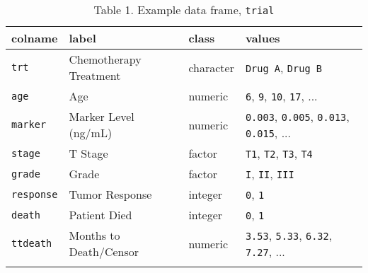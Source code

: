 \captionsetup[table]{labelformat=empty,skip=1pt}
\begin{longtable}{llll}
\toprule
colname & label & class & values \\ 
\midrule
\texttt{trt} & Chemotherapy Treatment & character & \texttt{Drug A}, \texttt{Drug B} \\ 
\texttt{age} & Age & numeric & \texttt{6}, \texttt{9}, \texttt{10}, \texttt{17}, ... \\ 
\texttt{marker} & Marker Level (ng/mL) & numeric & \texttt{0.003}, \texttt{0.005}, \texttt{0.013}, \texttt{0.015}, ... \\ 
\texttt{stage} & T Stage & factor & \texttt{T1}, \texttt{T2}, \texttt{T3}, \texttt{T4} \\ 
\texttt{grade} & Grade & factor & \texttt{I}, \texttt{II}, \texttt{III} \\ 
\texttt{response} & Tumor Response & integer & \texttt{0}, \texttt{1} \\ 
\texttt{death} & Patient Died & integer & \texttt{0}, \texttt{1} \\ 
\texttt{ttdeath} & Months to Death/Censor & numeric & \texttt{3.53}, \texttt{5.33}, \texttt{6.32}, \texttt{7.27}, ... \\ 
\bottomrule\caption{\label{tab:caption}Table 1. Example data frame, \texttt{trial}}\\

\end{longtable}

